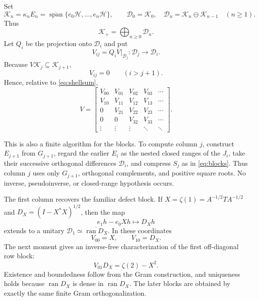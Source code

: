 \documentclass[11pt]{article}
\newcommand{\Hh}{\mathcal H}
\newcommand{\Kp}{\mathcal K_+}
\newcommand{\ran}{\operatorname{ran}}
\newcommand{\spann}{\operatorname{span}}
\begin{document}
Set
\[
 \mathcal K_n=\kappa_nE_n
   =\overline{\spann}\{e_0\Hh,\ldots,e_n\Hh\},
 \qquad
 \mathcal D_0=\mathcal K_0,
 \quad
 \mathcal D_n=\mathcal K_n\ominus\mathcal K_{n-1}\quad(n\geq1).
\]
Thus
\begin{equation}\label{eq:shellsum}
 \Kp=\bigoplus_{n\geq0}\mathcal D_n.
\end{equation}
Let $Q_i$ be the projection onto $\mathcal D_i$ and put
\begin{equation}\label{eq:blocks}
 V_{ij}=Q_iV|_{\mathcal D_j}:\mathcal D_j\longrightarrow\mathcal D_i.
\end{equation}
Because $V\mathcal K_j\subseteq\mathcal K_{j+1}$,
\begin{equation}\label{eq:hessenbergzero}
 V_{ij}=0\qquad(i>j+1).
\end{equation}
Hence, relative to \eqref{eq:shellsum},
\begin{equation}\label{eq:hessenberg}
 V=\begin{bmatrix}
 V_{00}&V_{01}&V_{02}&V_{03}&\cdots\\
 V_{10}&V_{11}&V_{12}&V_{13}&\cdots\\
 0&V_{21}&V_{22}&V_{23}&\cdots\\
 0&0&V_{32}&V_{33}&\cdots\\
 \vdots&\vdots&\vdots&\ddots&\ddots
 \end{bmatrix}.
\end{equation}

This is also a finite algorithm for the blocks.  To compute column $j$,
construct $E_{j+1}$ from $G_{j+1}$, regard the earlier $E_i$ as the
nested closed ranges of the $J_i$, take their successive orthogonal
differences $\mathcal D_i$, and compress $S_j$ as in
\eqref{eq:blocks}.  Thus column $j$ uses only $G_{j+1}$, orthogonal
complements, and positive square roots.  No inverse, pseudoinverse, or
closed-range hypothesis occurs.

The first column recovers the familiar defect block.  If
$X=\zeta(1)=A^{-1/2}TA^{-1/2}$ and
$D_X=(I-X^*X)^{1/2}$, then the map
\[
 e_1h-e_0Xh\longmapsto D_Xh
\]
extends to a unitary $\mathcal D_1\simeq\overline{\ran D_X}$.  In
these coordinates
\begin{equation}\label{eq:firstblocks}
 V_{00}=X,\qquad V_{10}=D_X.
\end{equation}
The next moment gives an inverse-free characterization of the first
off-diagonal row block:
\begin{equation}\label{eq:nextblock}
 V_{01}D_X=\zeta(2)-X^2.
\end{equation}
Existence and boundedness follow from the Gram construction, and uniqueness
holds because $\ran D_X$ is dense in $\overline{\ran D_X}$.  The later
blocks are obtained by exactly the same finite Gram orthogonalization.
\end{document}
